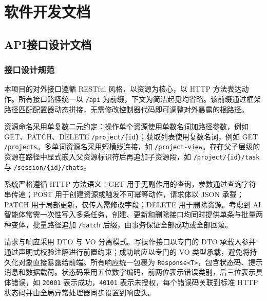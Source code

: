 \clearpage

\section{软件开发文档}


\subsection{API接口设计文档}


\subsubsection{接口设计规范}

\par 本项目的对外接口遵循 RESTful 风格，以资源为核心，以 HTTP 方法表达动作。所有接口路径统一以 \texttt{/api} 为前缀，下文为简洁起见均省略。该前缀通过框架路径匹配配置器动态拼接，无需修改控制器代码即可调整对外暴露的根路径。

\par 资源命名采用单复数二元约定：操作单个资源使用单数名词加路径参数，例如 GET、PATCH、DELETE \texttt{/project/\{id\}}；获取列表使用复数名词，例如 GET \texttt{/projects}。多单词资源名采用短横线连接，如 \texttt{/project-view}。存在父子层级的资源在路径中显式嵌入父资源标识符后再追加子资源段，如 \texttt{/project/\{id\}/task} 与 \texttt{/session/\{id\}/chats}。

\par 系统严格遵循 HTTP 方法语义：GET 用于无副作用的查询，参数通过查询字符串传递；POST 用于创建资源或触发不可幂等动作，请求体以 JSON 承载；PATCH 用于局部更新，仅传入需修改字段；DELETE 用于删除资源。考虑到 AI 智能体常需一次性写入多条任务，创建、更新和删除接口均同时提供单条与批量两种变体，批量路径追加 \texttt{/batch} 后缀，由事务保证全部成功或全部回滚。

\par 请求与响应采用 DTO 与 VO 分离模式。写操作接口以专门的 DTO 承载入参并通过声明式校验注解进行前置约束；成功响应以专门的 VO 类型承载，避免将持久化对象直接暴露给前端。所有响应统一包裹为 \texttt{Response<T>}，包含状态码、提示消息和数据载荷。状态码采用五位数字编码，前两位表示错误类别，后三位表示具体错误，如 \texttt{20001} 表示成功，\texttt{40101} 表示未授权，每个错误码关联到标准 HTTP 状态码并由全局异常处理器同步设置到响应头。

